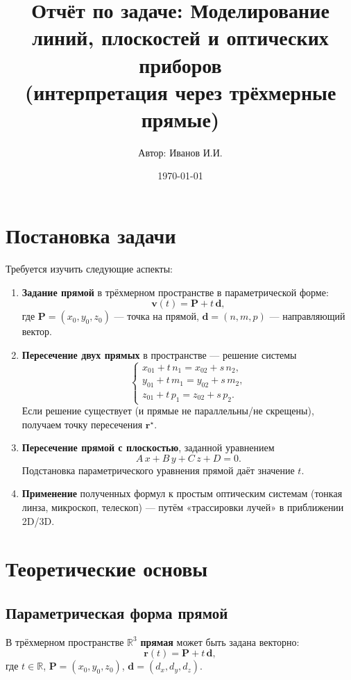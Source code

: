 \documentclass[a4paper,12pt]{article}
\title{Отчёт по задаче: Моделирование линий, плоскостей и оптических приборов \\(интерпретация через трёхмерные прямые)}
\author{Автор: Иванов И.И.}
\date{\today}
\begin{document}
\maketitle

\section{Постановка задачи}

Требуется изучить следующие аспекты:
\begin{enumerate}
  \item \textbf{Задание прямой} в трёхмерном пространстве в параметрической форме:
  \[
    \mathbf{v}(t) = \mathbf{P} + t\, \mathbf{d},
  \]
  где $\mathbf{P}=(x_0,y_0,z_0)$ --- точка на прямой, $\mathbf{d}=(n,m,p)$ --- направляющий вектор.
  \item \textbf{Пересечение двух прямых} в пространстве --- решение системы
  \[
    \begin{cases}
      x_{01} + t\,n_1 = x_{02} + s\,n_2,\\
      y_{01} + t\,m_1 = y_{02} + s\,m_2,\\
      z_{01} + t\,p_1 = z_{02} + s\,p_2.
    \end{cases}
  \]
  Если решение существует (и прямые не параллельны/не скрещены), получаем точку пересечения $\mathbf{r}^{\star}$.
  \item \textbf{Пересечение прямой с плоскостью}, заданной уравнением
  \[
    A\,x + B\,y + C\,z + D = 0.
  \]
  Подстановка параметрического уравнения прямой даёт значение $t$.
  \item \textbf{Применение} полученных формул к простым оптическим системам (тонкая линза, микроскоп, телескоп) --- путём «трассировки лучей» в приближении 2D/3D.
\end{enumerate}

\section{Теоретические основы}

\subsection{Параметрическая форма прямой}

В трёхмерном пространстве $\mathbb{R}^3$ \textbf{прямая} может быть задана векторно:
\[
  \mathbf{r}(t) = \mathbf{P} + t\, \mathbf{d}, 
\]
где $t\in \mathbb{R}$, $\mathbf{P}=(x_0,y_0,z_0)$, $\mathbf{d}=(d_x,d_y,d_z)$.
\end{document}
